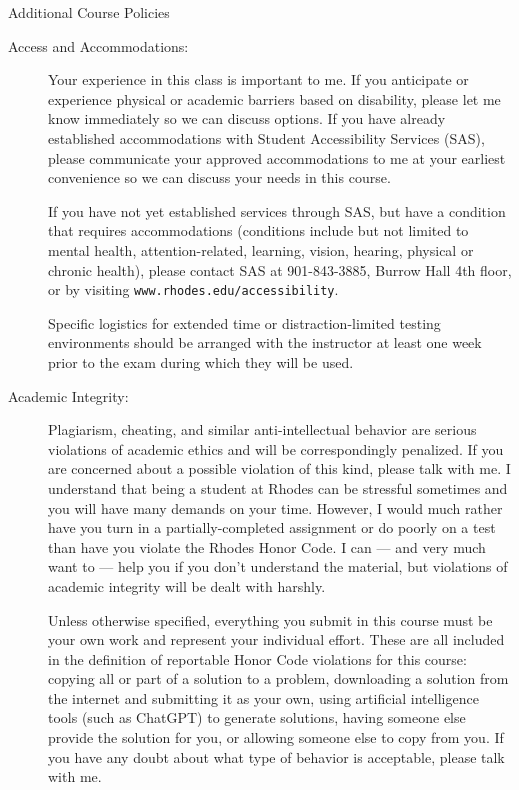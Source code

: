 \documentclass [letterpaper,11pt]{article}
\begin{document}
\begin{center}
\Large Additional Course Policies
\end{center}

\begin{description}

\item[Access and Accommodations:]
Your experience in this class is important to me.  If you anticipate or experience physical or academic barriers based on disability, please let me know immediately so we can discuss options.  If you have already established accommodations with Student Accessibility Services (SAS), please communicate your approved accommodations to me at your earliest convenience so we can discuss your needs in this course.

If you have not yet established services through SAS, but have a condition that requires accommodations (conditions include but not limited to mental health, attention-related, learning, vision, hearing, physical or chronic health), please contact SAS at 901-843-3885, Burrow Hall 4th floor, or by visiting  \texttt{www.rhodes.edu/accessibility}.

Specific logistics for extended time or distraction-limited testing environments should be arranged with the instructor 
at least one week prior to the exam during which they 
will be used.

  \item[Academic Integrity:]
   Plagiarism, cheating, and similar anti-intellectual behavior are serious violations of academic ethics and will be correspondingly penalized. If you are concerned about a possible violation of this kind, please talk with me.  I understand that being a student at Rhodes 
can be stressful sometimes and you will have many demands on your time.  However, I would
much rather have you turn in a partially-completed assignment or do poorly on a test than
have you violate the Rhodes Honor Code.  I can --- and very much want to --- help you if you don't understand the material, but violations of academic integrity will be dealt with harshly.
   
Unless otherwise specified, everything you submit in this course must be your own work and represent
your individual effort.  These are all included in the definition of reportable Honor Code violations for this course:
copying all or part of a solution to a problem, 
downloading a solution from the internet and submitting it as your own, using artificial intelligence tools (such as ChatGPT) to generate solutions,
having someone else provide the solution for you, or allowing someone else to copy from you.    If you have any doubt about what type of behavior is acceptable, please talk with me.


\end{description}
\end{document}

